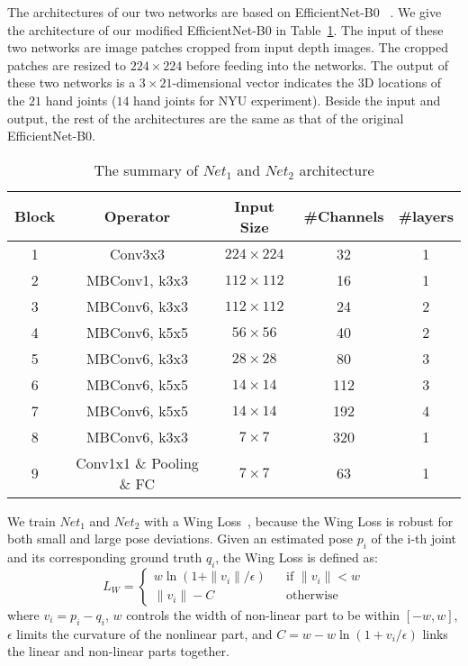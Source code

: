 \documentclass{article}
\begin{document}
The architectures of our two networks are based on EfficientNet-B0 ~\cite{tan2019efficientnet}. We give the architecture of our modified EfficientNet-B0 in Table~\ref{tab:effcientnet_b0}. The input of these two networks are image patches cropped from input depth images. The cropped patches are resized to $224\times 224$ before feeding into the networks. The output of these two networks is a $3 \times 21$-dimensional vector indicates the 3D locations of the $21$ hand joints ($14$ hand joints for NYU experiment). Beside the input and output, the rest of the architectures are the same as that of the original EfficientNet-B0.
\begin{table} \scriptsize
\centering
\begin{tabular}{c|c|c|c|c}
\hline
Block & Operator &  Input Size     &  \#Channels & \#layers  \\ \hline
\hline
1 & Conv3x3 &  $224 \times 224$     &  32 & 1  \\ \hline
2 & MBConv1, k3x3 &  $112 \times 112 $     &  16 & 1  \\ \hline
3 & MBConv6, k3x3 &  $112 \times 112 $     &  24 & 2  \\ \hline
4 & MBConv6, k5x5 &  $56 \times 56 $     &  40 & 2  \\ \hline
5 & MBConv6, k3x3 &  $28 \times 28 $     &  80 & 3  \\ \hline
6 & MBConv6, k5x5 &  $14 \times 14 $     &  112 & 3  \\ \hline
7 & MBConv6, k5x5 &  $14 \times 14 $     &  192 & 4  \\ \hline
8 & MBConv6, k3x3 &  $7 \times 7 $     &  320 & 1  \\ \hline
9 & Conv1x1 \& Pooling \& FC &  $7 \times 7$     &  63 & 1  \\ 
\hline
\end{tabular}	\caption{\label{tab:effcientnet_b0} The summary of $Net_1$ and $Net_2$ architecture}
\end{table}

We train $Net_1$ and $Net_2$ with a Wing Loss~\cite{feng2018wing}, because the Wing Loss is robust for both small and large pose deviations. Given an estimated pose $p_i$ of the i-th joint and its corresponding ground truth $q_i$, the Wing Loss is defined as:
\begin{equation}
    L_{W}=\left\{
        \begin{array}{lcl}
            w\ln(1+\|v_i\|/\epsilon) & & \text{if }\|v_i\|<w \\
            \|v_i\|-C  & & \text{otherwise}
        \end{array}\right.
\end{equation}
where $v_i=p_i-q_i$, $w$ controls the width of non-linear part to be within $[-w, w]$, $\epsilon$ limits the curvature of the nonlinear part, and $C=w-w\ln(1+v_i/\epsilon)$ links the linear and non-linear parts together.
\end{document}
